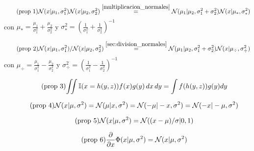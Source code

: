 \documentclass[article]{jss}
\newif\ifen
\newif\ifes
\newcommand{\en}[1]{\ifen#1\fi}
\newcommand{\es}[1]{\ifes#1\fi}
\newcommand{\N}{\mathcal{N}}
\begin{document}

\en{Let $\N$ be the Gaussian probability distribution, $\Phi$ the cumulative Gaussian distribution, $\mathbb{I}$ the indicator function.}
\es{Sea $\N$ la ditribuci\'on de probabilidad Gaussiana, $\Phi$ la acumulada de una distribuc\'on Gaussiana, $\mathbb{I}$ la funci\'on indicadora.}
%
\begin{equation}\label{eq:propiedad_1} \tag{\text{prop 1}}
\N(x|\mu_1,\sigma_1^2)\N(x|\mu_2,\sigma_2^2) \overset{\ref{multiplicacion_normales}}{=} \N(\mu_1|\mu_2,\sigma_1^2+\sigma_2^2) \N(x|\mu_{*},\sigma_{*}^2)
\end{equation}
%
con $\mu_{*} = \frac{\mu_1}{\sigma_1^2} + \frac{\mu_2}{\sigma_2^2}$ y $\sigma_{*}^2 = \left(\frac{1}{\sigma_1^2} + \frac{1}{\sigma_2^2} \right)^{-1}$ 

\begin{equation}\label{eq:propiedad_2} \tag{\text{prop 2}}
\N(x|\mu_1,\sigma_1^2)/\N(x|\mu_2,\sigma_2^2) \overset{\ref{sec:division_normales}}{=} \N(\mu_1|\mu_2,\sigma_1^2+\sigma_2^2) \N(x|\mu_{\div},\sigma_{\div}^2)
\end{equation}
%
con $\mu_{\div} = \frac{\mu_1}{\sigma_1^2} - \frac{\mu_2}{\sigma_2^2}$ y $\sigma_{\div}^2 = \left(\frac{1}{\sigma_1^2} - \frac{1}{\sigma_2^2} \right)^{-1}$ 

\begin{equation}\label{eq:integral_con_indicadora} \tag{\text{prop 3}}
\begin{split}
 \iint  \mathbb{I}(x=h(y,z)) f(x) g(y)\, dx\, dy = \int f(h(y,z)) g(y) dy
 \end{split}
\end{equation}

\begin{equation}\label{eq:simetria} \tag{\text{prop 4}}
 \N(x|\mu,\sigma^2) = \N(\mu|x,\sigma^2) = \N(-\mu|-x,\sigma^2) = \N(-x|-\mu,\sigma^2) 
\end{equation}

\begin{equation}\label{eq:estandarizar} \tag{\text{prop 5}}
  \N(x|\mu,\sigma^2) = \N((x-\mu)/\sigma | 0, 1)
\end{equation}

\begin{equation}\label{eq:phi_norm} \tag{\text{prop 6}}
 \frac{\partial}{\partial x} \Phi(x|\mu,\sigma^2) = \N(x|\mu,\sigma^2)
\end{equation}
\end{document}
